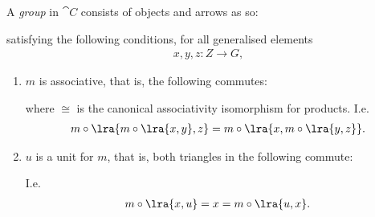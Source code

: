 \documentclass{article}
\begin{document}
\begin{definition}
    A \emph{group} in $\cat C$ consists of objects and arrows as so:

    \begin{center}
    \end{center}
    
    satisfying the following conditions, for all generalised elements
    \begin{align*}
        x,y,z:Z\to G,
    \end{align*}

    \begin{enumerate}
        \item $m$ is associative, that is, the following commutes: \begin{center}
        \end{center}
        where $\cong$ is the canonical associativity isomorphism for products. I.e. \begin{align*}
            m\circ \lra{m\circ \lra{x,y}, z} = m\circ\lra{x,m\circ\lra{y,z}}.
        \end{align*}
        \item $u$ is a unit for $m$, that is, both triangles in the following commute: \begin{center}
        \end{center}
        I.e. \begin{align*}
            m\circ\lra{x,u} = x = m\circ\lra{u, x}.

\end{align*}
\end{enumerate}
\end{definition}
\end{document}
